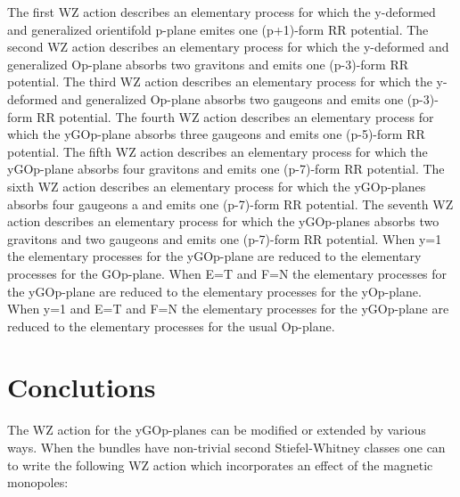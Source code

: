 \documentclass[a4paper,a4paper]{article}
\begin{document}
\begin{center}
{  \coordHE{} }
\end{center}
The first WZ action describes an elementary process for which the y-deformed and generalized orientifold p-plane emites one (p+1)-form RR potential.
The second WZ action describes an elementary process for which the y-deformed and generalized Op-plane absorbs two gravitons and emits one (p-3)-form RR potential.
The third WZ action describes an elementary process for which the y-deformed and generalized Op-plane absorbs two gaugeons and emits one (p-3)-form RR potential.
The fourth WZ action describes an elementary process for which the yGOp-plane absorbs three gaugeons and emits one (p-5)-form RR potential. 
The fifth WZ action describes an elementary process for which the yGOp-plane absorbs four gravitons and emits one (p-7)-form RR potential.
The sixth WZ action describes an elementary process for which the yGOp-planes absorbs four gaugeons a and emits one (p-7)-form RR potential.
The seventh WZ action describes an elementary process for which the yGOp-planes absorbs two gravitons and two gaugeons  and emits one (p-7)-form RR potential.
When y=1 the elementary processes for the yGOp-plane are reduced to the elementary processes for the GOp-plane.  When E=T and F=N the elementary processes for the yGOp-plane are reduced to the elementary processes for the yOp-plane.  When y=1 and E=T and F=N the elementary processes for the yGOp-plane are reduced to the elementary processes for the usual Op-plane.
 
\section{Conclutions}

The WZ action for the yGOp-planes can be modified or extended by various ways.
When the bundles have non-trivial second Stiefel-Whitney classes one can to write the following WZ action which incorporates an effect of the magnetic monopoles:

\begin{center}
{  \coordHE{} }
\end{center}
\end{document}
